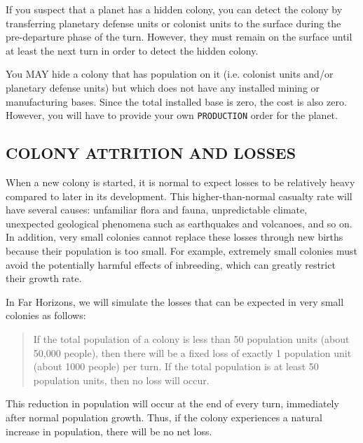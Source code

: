 \documentclass[10pt,titlepage]{article}
\begin{document}
If you suspect that a planet has a hidden colony, you can detect the colony by
transferring planetary defense units or colonist units to the surface during
the pre-departure phase of the turn.  However, they must remain on the surface
until at least the next turn in order to detect the hidden colony.

You MAY hide a colony that has population on it (i.e. colonist units and/or
planetary defense units) but which does not have any installed mining or
manufacturing bases.  Since the total installed base is zero, the cost is also
zero.  However, you will have to provide your own \texttt{PRODUCTION} order for the
planet.


\subsection{COLONY ATTRITION AND LOSSES}
\label{sec:colorattritionlosses}


When a new colony is started, it is normal to expect losses to be relatively
heavy compared to later in its development.  This higher-than-normal casualty
rate will have several causes: unfamiliar flora and fauna, unpredictable
climate, unexpected geological phenomena such as earthquakes and volcanoes, and
so on.  In addition, very small colonies cannot replace these losses through
new births because their population is too small.  For example, extremely small
colonies must avoid the potentially harmful effects of inbreeding, which can
greatly restrict their growth rate.

In Far Horizons, we will simulate the losses that can be expected in very small
colonies as follows:

\begin{quotation}
	If the total population of a colony is less than 50 population
	units (about 50,000 people), then there will be a fixed loss of
	exactly 1 population unit (about 1000 people) per turn.  If the
	total population is at least 50 population units, then no loss
	will occur.\end{quotation} 

This reduction in population will occur at the end of every turn, immediately
after normal population growth.  Thus, if the colony experiences a natural
increase in population, there will be no net loss.
\end{document}

